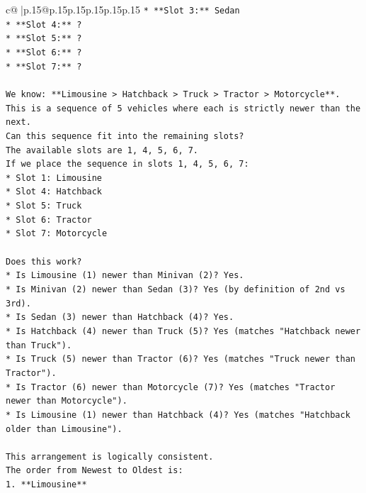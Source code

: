 \documentclass{article}
\begin{document}
{\begin{supertabular}{c@{$\;$}|p{.15\linewidth}@{}p{.15\linewidth}p{.15\linewidth}p{.15\linewidth}p{.15\linewidth}p{.15\linewidth}}
{{{\texttt{*   **Slot 3:** Sedan} \\
\texttt{*   **Slot 4:** ?} \\
\texttt{*   **Slot 5:** ?} \\
\texttt{*   **Slot 6:** ?} \\
\texttt{*   **Slot 7:** ?} \\
\\ 
\texttt{We know: **Limousine > Hatchback > Truck > Tractor > Motorcycle**.} \\
\texttt{This is a sequence of 5 vehicles where each is strictly newer than the next.} \\
\texttt{Can this sequence fit into the remaining slots?} \\
\texttt{The available slots are 1, 4, 5, 6, 7.} \\
\texttt{If we place the sequence in slots 1, 4, 5, 6, 7:} \\
\texttt{*   Slot 1: Limousine} \\
\texttt{*   Slot 4: Hatchback} \\
\texttt{*   Slot 5: Truck} \\
\texttt{*   Slot 6: Tractor} \\
\texttt{*   Slot 7: Motorcycle} \\
\\ 
\texttt{Does this work?} \\
\texttt{*   Is Limousine (1) newer than Minivan (2)? Yes.} \\
\texttt{*   Is Minivan (2) newer than Sedan (3)? Yes (by definition of 2nd vs 3rd).} \\
\texttt{*   Is Sedan (3) newer than Hatchback (4)? Yes.} \\
\texttt{*   Is Hatchback (4) newer than Truck (5)? Yes (matches "Hatchback newer than Truck").} \\
\texttt{*   Is Truck (5) newer than Tractor (6)? Yes (matches "Truck newer than Tractor").} \\
\texttt{*   Is Tractor (6) newer than Motorcycle (7)? Yes (matches "Tractor newer than Motorcycle").} \\
\texttt{*   Is Limousine (1) newer than Hatchback (4)? Yes (matches "Hatchback older than Limousine").} \\
\\ 
\texttt{This arrangement is logically consistent.} \\
\texttt{The order from Newest to Oldest is:} \\
\texttt{1.  **Limousine**} \\
}}}
\end{supertabular}}
\end{document}
